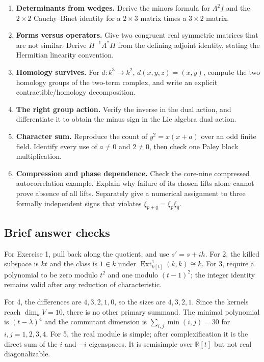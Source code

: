 \documentclass[
  11pt,
]{article}
\begin{document}
\begin{enumerate}
\item
  \textbf{Determinants from wedges.} Derive the minors formula for
  \(\Lambda^2f\) and the \(2\times2\) Cauchy--Binet identity for a
  \(2\times3\) matrix times a \(3\times2\) matrix.
\item
  \textbf{Forms versus operators.} Give two congruent real symmetric
  matrices that are not similar. Derive \(H^{-1}A^*H\) from the defining
  adjoint identity, stating the Hermitian linearity convention.
\item
  \textbf{Homology survives.} For \(d:k^3\to k^2\), \(d(x,y,z)=(x,y)\),
  compute the two homology groups of the two-term complex, and write an
  explicit contractible/homology decomposition.
\item
  \textbf{The right group action.} Verify the inverse in the dual
  action, and differentiate it to obtain the minus sign in the Lie
  algebra dual action.
\item
  \textbf{Character sum.} Reproduce the count of \(y^2=x(x+a)\) over an
  odd finite field. Identify every use of \(a\ne0\) and \(2\ne0\), then
  check one Paley block multiplication.
\item
  \textbf{Compression and phase dependence.} Check the core-nine
  compressed autocorrelation example. Explain why failure of its chosen
  lifts alone cannot prove absence of all lifts. Separately give a
  numerical assignment to three formally independent signs that violates
  \(\xi_{p+q}=\xi_p\xi_q\).
\end{enumerate}

\subsection*{Brief answer checks}\label{brief-answer-checks}

For Exercise 1, pull back along the quotient, and use \(s'=s+i h\). For
2, the killed subspace is \(kt\) and the class is \(1\in k\) under
\(\operatorname{Ext}^1_{k[t]}(k,k)\cong k\). For 3, require a polynomial
to be zero modulo \(t^2\) and one modulo \((t-1)^2\); the integer
identity remains valid after any reduction of characteristic.

For 4, the differences are \(4,3,2,1,0\), so the sizes are \(4,3,2,1\).
Since the kernels reach \(\dim_kV=10\), there is no other primary
summand. The minimal polynomial is \((t-\lambda)^4\) and the commutant
dimension is \(\sum_{i,j}\min(i,j)=30\) for \(i,j=1,2,3,4\). For 5, the
real module is simple; after complexification it is the direct sum of
the \(i\) and \(-i\) eigenspaces. It is semisimple over \(\mathbb R[t]\)
but not real diagonalizable.
\end{document}
